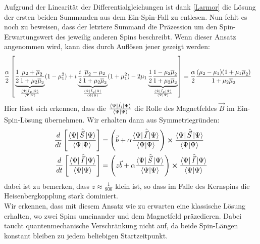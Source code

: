 \noindent Aufgrund der Linearität der Differentialgleichungen ist dank \autoref{Larmor} die Lösung der ersten beiden Summanden aus dem Ein-Spin-Fall 
zu entlesen. Nun fehlt es noch zu beweisen, dass der letztere Summand die Präzession um den Spin-Erwartungswert des jeweilig anderen Spins beschreibt. 
Wenn dieser Ansatz angenommen wird, kann dies durch Auflösen jener gezeigt werden:  
\begin{align}
     \frac{\alpha}{2}\left[\underbrace{\frac{1}{2}\frac{\mu_2 + \overline{\mu}_2}{1+\mu_2\overline{\mu}_2}}_{\frac{\bra{\Psi}\hat{I}_x\ket{\Psi}}{\bra{\Psi}\ket{\Psi}}}(1-\mu_1^2) 
     + i \underbrace{\frac{i}{2}\frac{\overline{\mu}_2 -\mu_2}{1+\mu_2\overline{\mu}_2}}_{\frac{\bra{\Psi}\hat{I}_y\ket{\Psi}}{\bra{\Psi}\ket{\Psi}}}(1+\mu_1^2) 
     - 2\mu_1\underbrace{\frac{1}{2}\frac{1-\mu_2\overline{\mu}_2}{1+\mu_2\overline{\mu}_2}}_{\frac{\bra{\Psi}\hat{I}_z\ket{\Psi}}{\bra{\Psi}\ket{\Psi}}} \right]
     &= \frac{\alpha}{2} \frac{(\mu_2-\mu_1)(1+\mu_1\overline{\mu}_2)}{1+\mu_2\overline{\mu}_2}
\end{align}
Hier lässt sich erkennen, dass die $\frac{\bra{\Psi}\hat{I_i}\ket{\Psi}}{\bra{\Psi}\ket{\Psi}}$ die Rolle des Magnetfeldes $\vec{B}$ im Ein-Spin-Lösung 
übernehmen. Wir erhalten dann aus Symmetriegründen:
\begin{align}
    \frac{d}{dt}\left[\frac{\bra{\Psi}\hat{\vec{S}}\ket{\Psi}}{\bra{\Psi}\ket{\Psi}}\right] &= \left(\vec{b} + \alpha \frac{\bra{\Psi}\hat{\vec{I}}\ket{\Psi}}{\bra{\Psi}\ket{\Psi}}\right)\cross\frac{\bra{\Psi}\hat{\vec{S}}\ket{\Psi}}{\bra{\Psi}\ket{\Psi}}\\
    \frac{d}{dt}\left[\frac{\bra{\Psi}\hat{\vec{I}}\ket{\Psi}}{\bra{\Psi}\ket{\Psi}}\right] &= \left(z\vec{b} + \alpha \frac{\bra{\Psi}\hat{\vec{S}}\ket{\Psi}}{\bra{\Psi}\ket{\Psi}}\right)\cross\frac{\bra{\Psi}\hat{\vec{I}}\ket{\Psi}}{\bra{\Psi}\ket{\Psi}}
\end{align}
\noindent dabei ist zu bemerken, dass $z\approx\frac{1}{800}$ klein ist, so dass im Falle des Kernspins die Heisenbergkopplung stark dominiert.\\
Wir erkennen, dass mit diesem Ansatz wie zu erwarten eine klassische Lösung erhalten, wo zwei Spins umeinander und dem Magnetfeld präzedieren. Dabei 
taucht quantenmechanische Verschränkung nicht auf, da beide Spin-Längen konstant bleiben zu jedem beliebigen Startzeitpunkt.





















